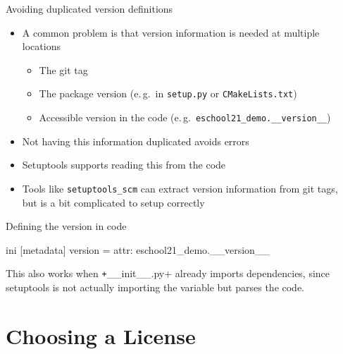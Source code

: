 \begin{frame}[fragile, c]{Avoiding duplicated version definitions}
  \begin{itemize}
    \item A common problem is that version information is needed at multiple locations
      \begin{itemize}
        \item The git tag
        \item The package version (e.\,g.\ in \texttt{setup.py} or \texttt{CMakeLists.txt})
        \item Accessible version in the code (e.\,g.\ \texttt{eschool21_demo.__version__})
      \end{itemize}
    \item Not having this information duplicated avoids errors
    \item Setuptools supports reading this from the code
    \item Tools like \texttt{setuptools\_scm} can extract version information from git tags, \\
      but is a bit complicated to setup correctly
  \end{itemize}
\end{frame}

\begin{frame}[fragile, c]{Defining the version in code}

  \begin{code}[title=setup.cfg]{ini}
    [metadata]
    version = attr: eschool21_demo.__version__
  \end{code}

  This also works when \texttt+__init__.py+ already imports dependencies,
  since setuptools is not actually importing the variable but parses the code.
\end{frame}


\section{Choosing a License}

